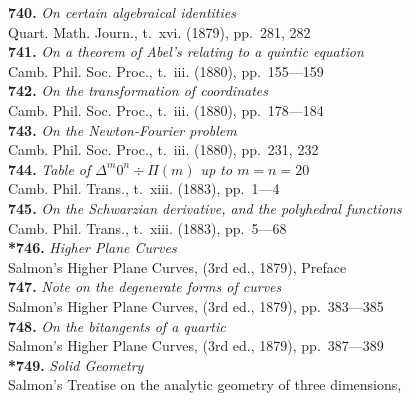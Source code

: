 \documentclass[12pt,a4paper,oneside]{book}
\begin{document}
\footnotesize
\noindent\textbf{740.} \textit{On certain algebraical identities} \\
\hspace*{2em}Quart. Math. Journ., t.~xvi. (1879), pp.~281, 282\\[0.2em]
\textbf{741.} \textit{On a theorem of Abel's relating to a quintic equation} \\
\hspace*{2em}Camb. Phil. Soc. Proc., t.~iii. (1880), pp.~155---159\\[0.2em]
\textbf{742.} \textit{On the transformation of coordinates} \\
\hspace*{2em}Camb. Phil. Soc. Proc., t.~iii. (1880), pp.~178---184\\[0.2em]
\textbf{743.} \textit{On the Newton-Fourier problem} \\
\hspace*{2em}Camb. Phil. Soc. Proc., t.~iii. (1880), pp.~231, 232\\[0.2em]
\textbf{744.} \textit{Table of $\Delta^m 0^n \div \Pi(m)$ up to $m=n=20$} \\
\hspace*{2em}Camb. Phil. Trans., t.~xiii. (1883), pp.~1---4\\[0.2em]
\textbf{745.} \textit{On the Schwarzian derivative, and the polyhedral functions} \\
\hspace*{2em}Camb. Phil. Trans., t.~xiii. (1883), pp.~5---68\\[0.2em]
\textbf{*746.} \textit{Higher Plane Curves} \\
\hspace*{2em}Salmon's Higher Plane Curves, (3rd ed., 1879), Preface\\[0.2em]
\textbf{747.} \textit{Note on the degenerate forms of curves} \\
\hspace*{2em}Salmon's Higher Plane Curves, (3rd ed., 1879), pp.~383---385\\[0.2em]
\textbf{748.} \textit{On the bitangents of a quartic} \\
\hspace*{2em}Salmon's Higher Plane Curves, (3rd ed., 1879), pp.~387---389\\[0.2em]
\textbf{*749.} \textit{Solid Geometry} \\
\hspace*{2em}Salmon's Treatise on the analytic geometry of three dimensions,\\
\end{document}
